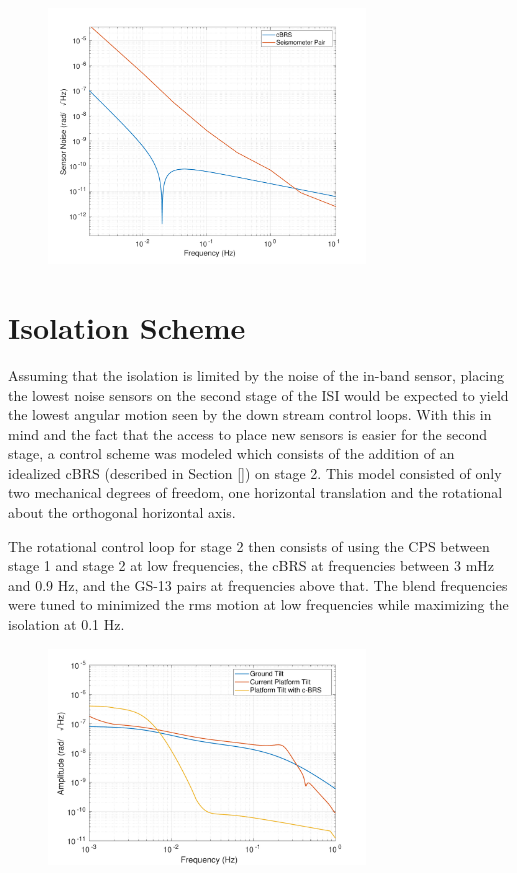 \documentclass [12pt, proquest]{uwthesis}[2019]
\begin{document}
\begin{figure}%
\begin{center}
\includegraphics[width=0.75\textwidth]{SensorNoise.pdf}
\caption{}
\label{sensNoise}
\end{center}
\end{figure}

\section{Isolation Scheme} \label{IsoScheme}

Assuming that the isolation is limited by the noise of the in-band sensor, placing the lowest noise sensors on the second stage of the ISI would be expected to yield the lowest angular motion seen by the down stream control loops. With this in mind and the fact that the access to place new sensors is easier for the second stage, a control scheme was modeled which consists of the addition of an idealized cBRS (described in Section \ref{}) on stage 2. This model consisted of only two mechanical degrees of freedom, one horizontal translation and the rotational about the orthogonal horizontal axis.

The rotational control loop for stage 2 then consists of using the CPS between stage 1 and stage 2 at low frequencies, the cBRS at frequencies between 3 mHz and 0.9 Hz, and the GS-13 pairs at frequencies above that. The blend frequencies were tuned to minimized the rms motion at low frequencies while maximizing the isolation at 0.1 Hz. 

\begin{figure}%
\begin{center}
\includegraphics[width=0.75\textwidth]{cBRSRotation.pdf}
\caption{}
\label{cBRSR}
\end{center}
\end{figure}
\end{document}
